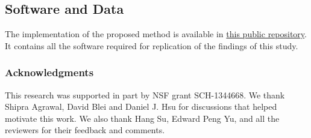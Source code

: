 \documentclass{article}
\begin{document}
\subsection{Software and Data}
The implementation of the proposed method is available in \href{https://github.com/iurteaga/bandits}{this public repository}. It contains all the software required for replication of the findings of this study.

\subsubsection*{Acknowledgments}
This research was supported in part by NSF grant SCH-1344668. We thank Shipra Agrawal, David Blei and Daniel J. Hsu for discussions that helped motivate this work. We also thank Hang Su, Edward Peng Yu, and all the reviewers for their feedback and comments.



\end{document}
